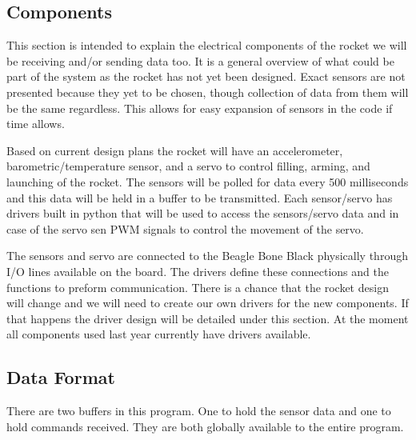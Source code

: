 \documentclass[10pt,draftclsnofoot,onecolumn,compsoc]{IEEEtran}
\begin{document}
\subsection{Components} 
This section is intended to explain the electrical components of the rocket we will be receiving and/or sending data too. It is a general overview of what could be part of the system as the rocket has not yet been designed. Exact sensors are not presented because they yet to be chosen, though collection of data from them will be the same regardless. This allows for easy expansion of sensors in the code if time allows.\par
Based on current design plans the rocket will have an accelerometer, barometric/temperature sensor, and a servo to control filling, arming, and launching of the rocket. The sensors will be polled for data every 500 milliseconds and this data will be held in a buffer to be transmitted. Each sensor/servo has drivers built in python that will be used to access the sensors/servo data and in case of the servo sen PWM signals to control the movement of the servo.\par
The sensors and servo are connected to the Beagle Bone Black physically through I/O lines available on the board. The drivers define these connections and the functions to preform communication. There is a chance that the rocket design will change and we will need to create our own drivers for the new components. If that happens the driver design will be detailed under this section. At the moment all components used last year currently have drivers available.\par
\subsection{Data Format}
There are two buffers in this program. One to hold the sensor data and one to hold commands received. They are both globally available to the entire program.
\end{document}
